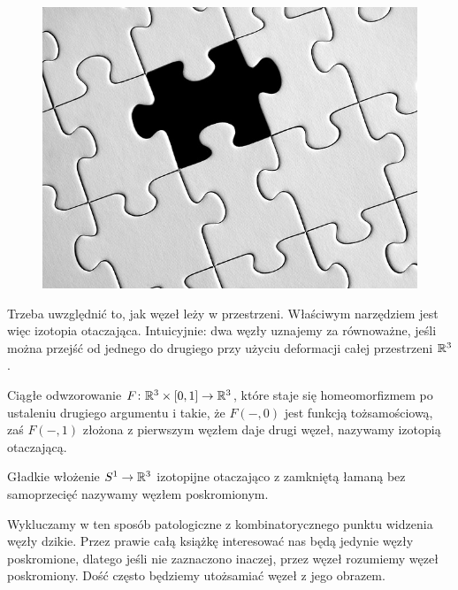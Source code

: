 \begin{figure}[H]
\begin{minipage}[b]{.23\linewidth}
	\end{minipage}
	\begin{minipage}[b]{.23\linewidth}
		\centering
		\includegraphics[width=\linewidth]{../data/missing.jpg}
	\end{minipage}
\end{figure}

Trzeba uwzględnić to, jak węzeł leży w przestrzeni.
Właściwym narzędziem jest więc izotopia otaczająca.
Intuicyjnie: dwa węzły uznajemy za równoważne,
jeśli można przejść od jednego do drugiego przy użyciu deformacji całej przestrzeni $\mathbb R^3$.

\begin{definition} \label{def_ambient_isotopy}
	Ciągłe odwzorowanie $F \colon \mathbb R^3 \times [0,1] \to \mathbb R^3$,
	które staje się homeomorfizmem po ustaleniu drugiego argumentu i takie,
	że $F(-, 0)$ jest funkcją tożsamościową,
	zaś $F(-, 1)$ złożona z pierwszym węzłem daje drugi węzeł,
	nazywamy izotopią otaczającą.
\end{definition}

\begin{definition}[węzeł]
	\label{def:knot}
	Gładkie włożenie $S^1 \to \mathbb R^3$ izotopijne otaczająco z zamkniętą łamaną bez samoprzecięć nazywamy węzłem poskromionym.
\end{definition}

Wykluczamy w ten sposób patologiczne z kombinatorycznego punktu widzenia węzły dzikie.
Przez prawie całą książkę interesować nas będą jedynie węzły poskromione,
dlatego jeśli nie zaznaczono inaczej, przez węzeł rozumiemy węzeł poskromiony.
Dość często będziemy utożsamiać węzeł z jego obrazem.

